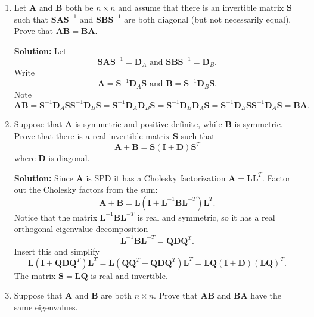 \documentclass[11pt,fleqn]{article}
\begin{document}
\begin{enumerate}
\item Let $\mathbf{A}$ and $\mathbf{B}$ both be $n\times n$ and assume that there is an invertible matrix $\mathbf{S}$ such that $\mathbf{SAS}^{-1}$ and  $\mathbf{SBS}^{-1}$ are both diagonal (but not necessarily equal). Prove that $\mathbf{AB} = \mathbf{BA}$.

{\bf Solution:} Let
\[\mathbf{SAS}^{-1}=\mathbf{D}_A\text{ and  }\mathbf{SBS}^{-1}=\mathbf{D}_B.\]
Write
\[\mathbf{A}=\mathbf{S}^{-1}\mathbf{D}_A\mathbf{S}\text{ and  }\mathbf{B}=\mathbf{S}^{-1}\mathbf{D}_B\mathbf{S}.\]
Note
\[\mathbf{AB} = \mathbf{S}^{-1}\mathbf{D}_A\mathbf{S}\mathbf{S}^{-1}\mathbf{D}_B\mathbf{S} = \mathbf{S}^{-1}\mathbf{D}_A\mathbf{D}_B\mathbf{S}=\mathbf{S}^{-1}\mathbf{D}_B\mathbf{D}_A\mathbf{S}=\mathbf{S}^{-1}\mathbf{D}_B\mathbf{S}\mathbf{S}^{-1}\mathbf{D}_A\mathbf{S} = \mathbf{BA}.\]

\item Suppose that $\mathbf{A}$ is symmetric and positive definite, while $\mathbf{B}$ is symmetric. Prove that there is a real invertible matrix $\mathbf{S}$ such that
\[\mathbf{A} + \mathbf{B} = \mathbf{S}\left(\mathbf{I} + \mathbf{D}\right)\mathbf{S}^T\]
where $\mathbf{D}$ is diagonal.

{\bf Solution:} Since {\bf A} is SPD it has a Cholesky factorization $\mathbf{A} = \mathbf{LL}^T$.
Factor out the Cholesky factors from the sum:
\[\mathbf{A} + \mathbf{B} = \mathbf{L}\left(\mathbf{I} + \mathbf{L}^{-1}\mathbf{BL}^{-T}\right)\mathbf{L}^T.\]
Notice that the matrix $\mathbf{L}^{-1}\mathbf{BL}^{-T}$ is real and symmetric, so it has a real orthogonal eigenvalue decomposition
\[\mathbf{L}^{-1}\mathbf{BL}^{-T} = \mathbf{QDQ}^T.\]
Insert this and simplify
\[\mathbf{L}\left(\mathbf{I} +\mathbf{QDQ}^T\right)\mathbf{L}^T = \mathbf{L}\left(\mathbf{QQ}^T +\mathbf{QDQ}^T\right)\mathbf{L}^T=\mathbf{LQ}\left(\mathbf{I} +\mathbf{D}\right)(\mathbf{LQ})^T.\]
The matrix $\mathbf{S} = \mathbf{LQ}$ is real and invertible.

\item Suppose that $\mathbf{A}$ and $\mathbf{B}$ are both $n\times n$. Prove that $\mathbf{AB}$ and $\mathbf{BA}$ have the same eigenvalues. %


\end{enumerate}
\end{document}
